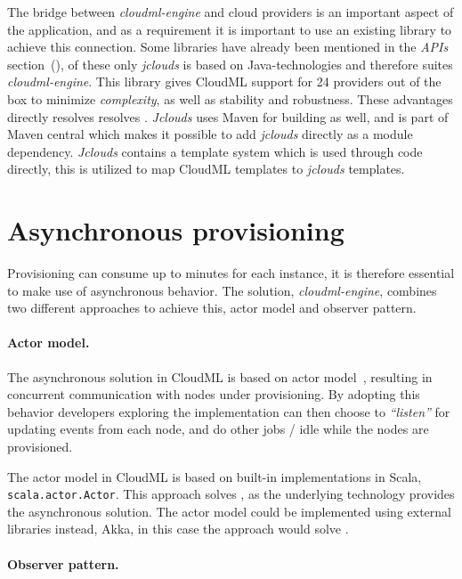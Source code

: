 The bridge between \emph{cloudml-engine} and cloud providers is an important aspect of the application, 
and as a requirement it is important to use an existing library to achieve this connection.
Some libraries have already been mentioned in the \emph{APIs} section~(),
of these only \emph{jclouds} is based on Java-technologies and therefore suites \emph{cloudml-engine}.
This library gives CloudML support for 24 providers out of the box to minimize \emph{complexity},
as well as stability and robustness.
These advantages directly resolves resolves .
\emph{Jclouds} uses Maven for building as well, and is part of Maven central which makes 
it possible to add \emph{jclouds} directly as a module dependency.
\emph{Jclouds} contains a template system which is used through code directly, this is utilized 
to map CloudML templates to \emph{jclouds} templates.

\section{Asynchronous provisioning}

Provisioning can consume up to minutes for each instance,
it is therefore essential to make use of asynchronous behavior.
The solution, \emph{cloudml-engine}, combines two different approaches to achieve this,
actor model and observer pattern.

\paragraph{Actor model.}

The asynchronous solution in CloudML is based on actor model~\cite{actors:haller07},
resulting in concurrent communication with nodes under provisioning.
By adopting this behavior developers exploring the implementation can then choose
to \emph{``listen''} for updating events from each node,
and do other jobs / idle while the nodes are provisioned.

The actor model in CloudML is based on built-in implementations in Scala, 
\texttt{scala.actor.Actor}.
This approach solves ,
as the underlying technology provides the asynchronous solution.
The actor model could be implemented using external libraries instead,
\eg Akka,
in this case the approach would solve .

\paragraph{Observer pattern.}

